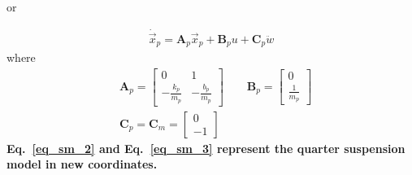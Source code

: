 \documentclass[12pt,a4paper,oneside]{book}
\begin{document}
\begin{onehalfspace}
\begin{equation}
\begin{aligned}
	\end{aligned}
\end{equation} 
or
\begin{mybox}
	\begin{equation}\label{eq_sm_2}
		\begin{aligned}
			\dot{\vec{x}}_p = \mathbf{A}_p{\vec{x}}_p + \mathbf{B}_p u + \mathbf{C}_p\ddot{w} 
		\end{aligned}
	\end{equation} 
	where
	\begin{equation}\label{eq_sm_3}
		\begin{aligned}
			&\mathbf{A}_p = \begin{bmatrix} 0 & 1 \\[6pt] -\frac{k_p}{m_p} & -\frac{b_p}{m_p} \end{bmatrix}\qquad \mathbf{B}_p = \begin{bmatrix} 0 \\[6pt] \frac{1}{m_p} \end{bmatrix} \\[6pt] &\mathbf{C}_p = \mathbf{C}_m =\begin{bmatrix} 0 \\[6pt] -1 \end{bmatrix}
		\end{aligned}
	\end{equation} 
	\textbf{Eq.~\ref{eq_sm_2} and Eq.~\ref{eq_sm_3} represent the quarter suspension model in new coordinates.}
\end{mybox}


\end{onehalfspace}
\end{document}
